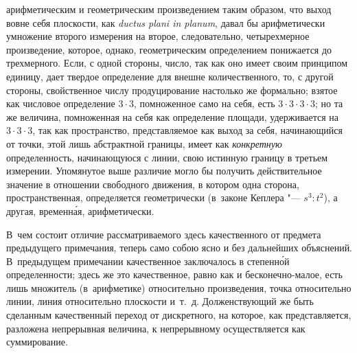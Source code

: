 арифметическим и геометрическим произведением таким образом, что выход вовне
себя плоскости, как {\em ductus plani in planum}, давал бы арифметически
умножение второго измерения на второе, следовательно, четырехмерное
произведение, которое, однако, геометрическим определением понижается до
трехмерного. Если, с одной стороны, число, так как оно имеет своим принципом
единицу, дает твердое определение для внешне количественного, то, с другой
стороны, свойственное числу продуцирование настолько же формально; взятое как
числовое определение $3\cdot 3$, помноженное само на себя, есть
$3\cdot 3\cdot 3\cdot 3$; но та же величина, помноженная на себя как определение
площади, удерживается на $3\cdot 3\cdot 3$, так как пространство,
представляемое как выход за себя, начинающийся от точки, этой лишь абстрактной
границы, имеет как {\em конкретную} определенность, начинающуюся с линии, свою
истинную границу в третьем измерении. Упомянутое выше различие могло бы
получить действительное значение в отношении свободного движения, в котором
одна сторона, пространственная, определяется геометрически (в~законе Кеплера
"--- $s^3:t^2$), а другая, временн\'{а}я, арифметически.

В~чем состоит отличие рассматриваемого здесь качественного от предмета
предыдущего примечания, теперь само собою ясно и без дальнейших объяснений.
В~предыдущем примечании качественное заключалось в степенн\'{о}й
определенности; здесь же это качественное, равно как и бесконечно-малое, есть
лишь множитель (в~арифметике) относительно произведения, точка относительно
линии, линия относительно плоскости и~т.~д. Долженствующий же быть сделанным
качественный переход от дискретного, на которое, как представляется, разложена
непрерывная величина, к непрерывному осуществляется как суммирование.

